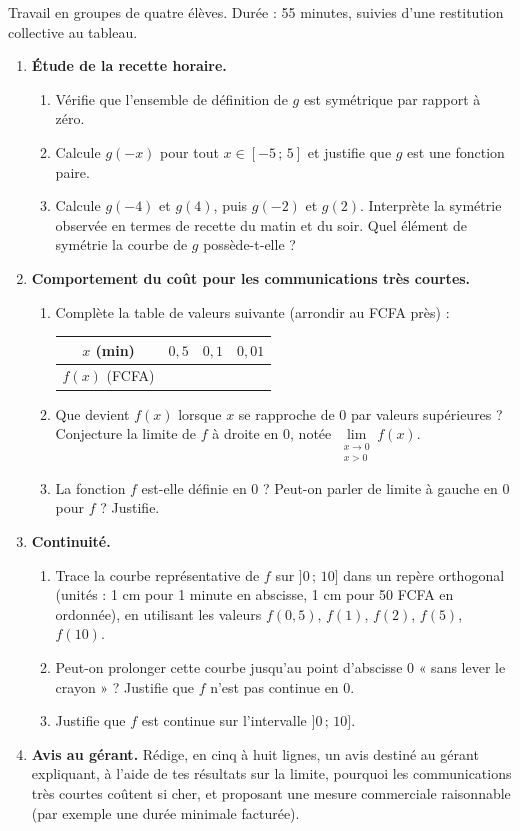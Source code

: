 \documentclass[11pt]{article}
\newcounter{popsec}
\newcounter{popsub}
\newcommand{\courssub}[1]{%
  \stepcounter{popsub}%
  \par\vspace{9pt}\noindent{\popxbold\fontsize{11.5}{13}\selectfont\color{popink}{\color{poporange}\thepopsec.\thepopsub}\hspace{6pt}#1}\par\nopagebreak\vspace{4pt}
}
\begin{document}
\courssub{Consignes}

Travail en groupes de quatre élèves. Durée : 55 minutes, suivies d'une restitution collective au tableau.

\begin{enumerate}
\item \textbf{Étude de la recette horaire.}
\begin{enumerate}
\item Vérifie que l'ensemble de définition de $g$ est symétrique par rapport à zéro.
\item Calcule $g(-x)$ pour tout $x \in [-5\,;\,5]$ et justifie que $g$ est une fonction paire.
\item Calcule $g(-4)$ et $g(4)$, puis $g(-2)$ et $g(2)$. Interprète la symétrie observée en termes de recette du matin et du soir. Quel élément de symétrie la courbe de $g$ possède-t-elle ?
\end{enumerate}
\item \textbf{Comportement du coût pour les communications très courtes.}
\begin{enumerate}
\item Complète la table de valeurs suivante (arrondir au FCFA près) :
\begin{center}
\begin{tabular}{|c|ccc|}\hline
\rowcolor{popblueL} $x$ (min) & $0{,}5$ & $0{,}1$ & $0{,}01$ \\ \hline
$f(x)$ (FCFA) & & & \\ \hline
\end{tabular}
\end{center}
\item Que devient $f(x)$ lorsque $x$ se rapproche de $0$ par valeurs supérieures ? Conjecture la limite de $f$ à droite en $0$, notée $\lim\limits_{\substack{x \to 0 \\ x > 0}} f(x)$.
\item La fonction $f$ est-elle définie en $0$ ? Peut-on parler de limite à gauche en $0$ pour $f$ ? Justifie.
\end{enumerate}
\item \textbf{Continuité.}
\begin{enumerate}
\item Trace la courbe représentative de $f$ sur $]0\,;\,10]$ dans un repère orthogonal (unités : 1 cm pour 1 minute en abscisse, 1 cm pour 50 FCFA en ordonnée), en utilisant les valeurs $f(0{,}5)$, $f(1)$, $f(2)$, $f(5)$, $f(10)$.
\item Peut-on prolonger cette courbe jusqu'au point d'abscisse $0$ « sans lever le crayon » ? Justifie que $f$ n'est pas continue en $0$.
\item Justifie que $f$ est continue sur l'intervalle $]0\,;\,10]$.
\end{enumerate}
\item \textbf{Avis au gérant.} Rédige, en cinq à huit lignes, un avis destiné au gérant expliquant, à l'aide de tes résultats sur la limite, pourquoi les communications très courtes coûtent si cher, et proposant une mesure commerciale raisonnable (par exemple une durée minimale facturée).
\end{enumerate}
\end{document}
